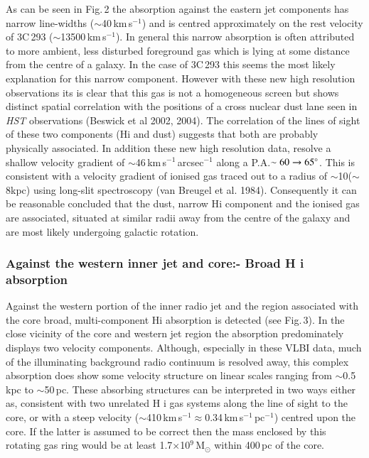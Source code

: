 \documentclass{evn2004}
\begin{document}
As can be seen in Fig.\,2 the absorption against the eastern jet
components has narrow line-widths ($\sim$40\,km\,s$^{-1}$) and is
centred approximately on the rest velocity of 3C\,293
($\sim$13500\,km\,s$^{-1}$). In general this narrow absorption is
often attributed to more ambient, less disturbed foreground gas which
is lying at some distance from the centre of a galaxy. In the case of
3C\,293 this seems the most likely explanation for this narrow
component. However with these new high resolution observations its is
clear that this gas is not a homogeneous screen but shows distinct
spatial correlation with the positions of a cross nuclear dust lane
seen in {\it HST} observations (Beswick et al 2002, 2004). The
correlation of the lines of sight of these two components (H{\sc i}
and dust) suggests that both are probably physically associated. In
addition these new high resolution data, resolve a shallow velocity
gradient of $\sim$46\,km\,s$^{-1}$\,arcsec$^{-1}$ along a
P.A.$\sim60\rightarrow65\hbox{$^\circ$}$. This is consistent with a velocity
gradient of ionised gas traced out to a radius of $\sim$10\arcsec ($\sim$8kpc)
using long-slit spectroscopy (van Breugel et al. 1984).  Consequently
it can be reasonable concluded that the dust, narrow H{\sc i}
component and the ionised gas are associated, situated at similar radii
away from the centre of the galaxy and are most likely undergoing
galactic rotation. 

\subsubsection{Against the western inner jet and core:- Broad H{\sc
i} absorption}

Against the western portion of the inner radio jet and the region
associated with the core broad, multi-component H{\sc i} absorption is
detected (see Fig.\,3). In the close vicinity of the core and western
jet region the absorption predominately displays two velocity
components.  Although, especially in these VLBI data, much of the
illuminating background radio continuum is resolved away, this complex
absorption does show some velocity structure on linear scales ranging
from $\sim$0.5\,kpc to $\sim$50\,pc. These absorbing structures can be
interpreted in two ways either as, consistent with two unrelated H{\sc
i} gas systems along the line of sight to the core, or with a steep
velocity ($\sim$410\,km\,s$^{-1}\approx$0.34\,km\,s$^{-1}$\,pc$^{-1}$)
centred upon the core. If the latter is assumed to be correct then the
mass enclosed by this rotating gas ring would be at least
1.7$\times$10$^9$\,M$_{\odot}$ within 400\,pc of the core. 
\end{document}
